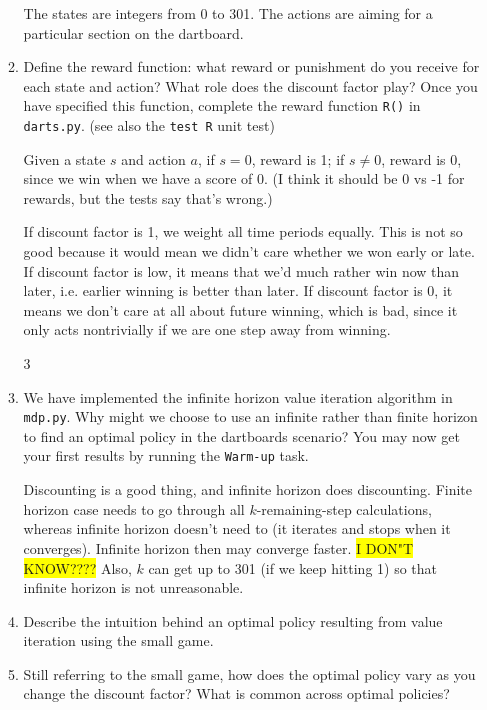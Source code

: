 \documentclass{article}
\newcommand{\edit}[1]{\colorbox{Yellow}{#1}}
\begin{document}
\begin{enumerate}
\begin{enumerate}
  The states are integers from 0 to 301. The actions are aiming for a
  particular section on the dartboard.  

  \item {Define the reward function: what reward or punishment
  do you receive for each state and action? What role does the discount
  factor play? Once you have specified this function, complete the
  reward function \texttt{R()} in \texttt{darts.py}. (see also the 
  \texttt{test R} unit test)}

  Given a state $s$ and action $a$, if $s=0$, reward is 1; if $s\neq 0$,
  reward is 0, since we win when we have a score of 0.
  (I think it should be 0 vs -1 for rewards, but the tests say that's wrong.)

  If discount factor is 1, we weight all time periods equally. This is
  not so good because it would mean we didn't care whether we won early
  or late. If discount factor is low, it means that we'd much rather win
  now than later, i.e. earlier winning is better than later. 
  If discount factor is 0, it means we don't care at all about future
  winning, which is bad, since it only acts nontrivially if we are one
  step away from winning. 

  \setcounter{enumii}3
  \item {We have implemented the infinite horizon value iteration
  algorithm in \texttt{mdp.py}. Why might we choose to use an infinite rather
  than finite horizon to find an optimal policy in the dartboards scenario? 
  You may now get your first results by running the \texttt{Warm-up} task.}

  Discounting is a good thing, and infinite horizon does discounting.  
  Finite horizon case needs to go 
  through all $k$-remaining-step calculations, whereas infinite horizon
  doesn't need to (it iterates and stops when it converges). Infinite
  horizon then may converge faster. \edit{I DON"T KNOW????} 
  Also, $k$ can get up to 301 (if we keep hitting 1) so that infinite
  horizon is not unreasonable. 
  
  \item {Describe the intuition behind an optimal policy resulting
  from value iteration using the small game.}

  \item {Still referring to the small game, how does the optimal
  policy vary as you change the discount factor? What is common
  across optimal policies?}



  \end{enumerate}


\end{enumerate}
\end{document}

